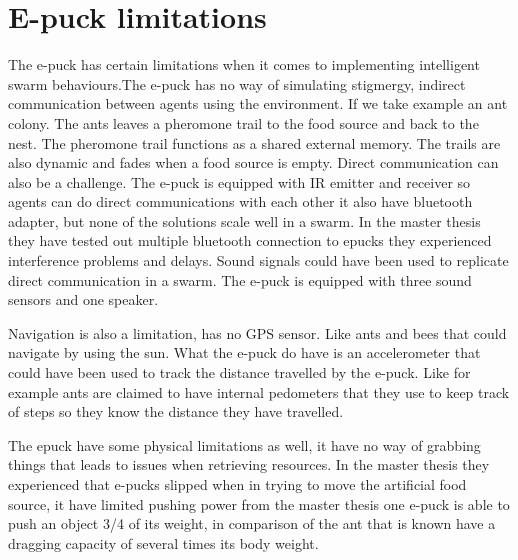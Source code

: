\section{E-puck limitations}

The e-puck has certain limitations when it comes to implementing intelligent swarm behaviours.The e-puck has no way of simulating stigmergy, indirect communication between agents using the environment. If we take example an ant colony. The ants leaves a pheromone trail to the food source and back to the nest. The pheromone trail functions as a shared external memory. The trails are also dynamic and fades when a food source is empty. Direct communication can also be a challenge. The e-puck is equipped with IR emitter and receiver so agents can do direct communications with each other it also have bluetooth adapter, but none of the solutions scale well in a swarm. In the master thesis\cite{master}  they have tested out multiple bluetooth connection to epucks they experienced interference problems and delays. Sound signals could have been used to replicate direct communication in a swarm. The e-puck is equipped  with three sound sensors and  one speaker.

Navigation is also a limitation, has no GPS sensor. Like ants and bees that could navigate by using the sun. What the e-puck do have is an accelerometer that could have been used to track the distance travelled by the e-puck. Like for example ants are claimed to have internal pedometers \cite{ants} that they use to keep track of steps so they know the distance they have travelled. 

The epuck have some physical limitations as well, it have no way of grabbing things that leads to issues when retrieving resources. In the  master thesis\cite{master}  they experienced that e-pucks slipped when in trying to move the artificial food source, it have limited pushing power from the master thesis\cite{master} one e-puck is able to push an object 3/4 of its weight, in comparison of the ant that is known have a dragging capacity of several times its body weight. 